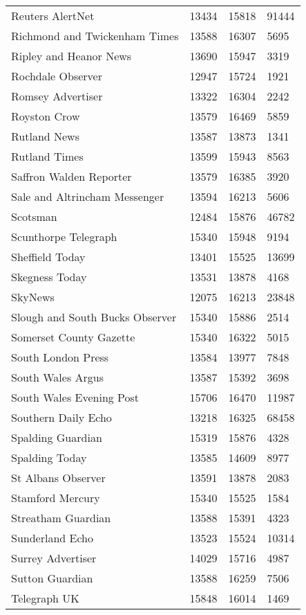 \begin{longtable}{p{}p{}p{}p{}}
  Reuters AlertNet & 13434 & 15818 & 91444 \\ 
  Richmond and Twickenham Times & 13588 & 16307 & 5695 \\ 
  Ripley and Heanor News & 13690 & 15947 & 3319 \\ 
  Rochdale Observer & 12947 & 15724 & 1921 \\ 
  Romsey Advertiser & 13322 & 16304 & 2242 \\ 
  Royston Crow & 13579 & 16469 & 5859 \\ 
  Rutland News & 13587 & 13873 & 1341 \\ 
  Rutland Times & 13599 & 15943 & 8563 \\ 
  Saffron Walden Reporter & 13579 & 16385 & 3920 \\ 
  Sale and Altrincham Messenger & 13594 & 16213 & 5606 \\ 
  Scotsman & 12484 & 15876 & 46782 \\ 
  Scunthorpe Telegraph & 15340 & 15948 & 9194 \\ 
  Sheffield Today & 13401 & 15525 & 13699 \\ 
  Skegness Today & 13531 & 13878 & 4168 \\ 
  SkyNews & 12075 & 16213 & 23848 \\ 
  Slough and South Bucks Observer & 15340 & 15886 & 2514 \\ 
  Somerset County Gazette & 15340 & 16322 & 5015 \\ 
  South London Press & 13584 & 13977 & 7848 \\ 
  South Wales Argus & 13587 & 15392 & 3698 \\ 
  South Wales Evening Post & 15706 & 16470 & 11987 \\ 
  Southern Daily Echo & 13218 & 16325 & 68458 \\ 
  Spalding Guardian & 15319 & 15876 & 4328 \\ 
  Spalding Today & 13585 & 14609 & 8977 \\ 
  St Albans Observer & 13591 & 13878 & 2083 \\ 
  Stamford Mercury & 15340 & 15525 & 1584 \\ 
  Streatham Guardian & 13588 & 15391 & 4323 \\ 
  Sunderland Echo & 13523 & 15524 & 10314 \\ 
  Surrey Advertiser & 14029 & 15716 & 4987 \\ 
  Sutton Guardian & 13588 & 16259 & 7506 \\ 
  Telegraph UK & 15848 & 16014 & 1469 \\ 

\end{longtable}
